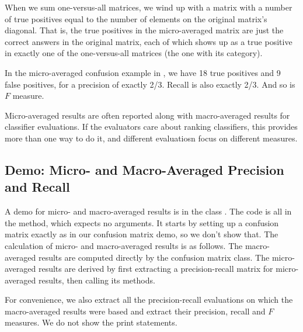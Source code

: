 When we sum one-versus-all matrices, we wind up with a matrix with a
number of true positives equal to the number of elements on the
original matrix's diagonal.  That is, the true positives in the
micro-averaged matrix are just the correct answers in the original
matrix, each of which shows up as a true positive in exactly one of
the one-versus-all matrices (the one with its category).  

In the micro-averaged confusion example in ,
we have 18 true positives and 9 false positives, for a precision of
exactly 2/3.  Recall is also exactly 2/3.  And so is $F$ measure.  

Micro-averaged results are often reported along with macro-averaged
results for classifier evaluations.  If the evaluators care about
ranking classifiers, this provides more than one way to do it, and
different evaluatiosn focus on different measures.

\subsection{Demo: Micro- and Macro-Averaged Precision and Recall}

A demo for micro- and macro-averaged results is in the class
.  The code is all in the  method,
which expects no arguments.  It starts by setting up a confusion
matrix exactly as in our confusion matrix demo, so we don't show that.
The calculation of micro- and macro-averaged results is as follows.
%
%
The macro-averaged results are computed directly by the confusion
matrix class.  The micro-averaged results are derived by first
extracting a precision-recall matrix for micro-averaged results,
then calling its methods.  

For convenience, we also extract all the precision-recall
evaluations on which the macro-averaged results were based and
extract their precision, recall and $F$ measures.
%
%
We do not show the print statements.

